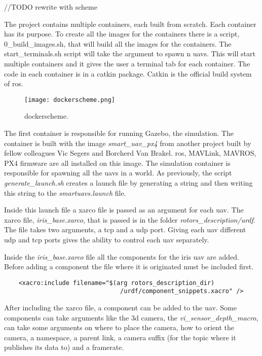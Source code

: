 //TODO rewrite with scheme

The project contains multiple containers, each built from scratch. Each container has its purpose. 
To create all the images for the containers there is a script, 0\_build\_images.sh, that will build 
all the images for the containers. 
The start\_terminals.sh script will take the argument to spawn n \acp{uav}. 
This will start multiple containers and it gives the user a terminal tab for each container. 
The code in each container is in a catkin package. Catkin is the official build system of \acs{ros}. 

\begin{figure}[ht]
    \centering
    \texttt{[image: dockerscheme.png]}
    \caption[dockerscheme]{dockerscheme\footnotemark.}
\end{figure}

The first container is responsible for running Gazebo, the simulation. 
The container is built with the image \textit{smart\_uav\_px4} 
from another project built by fellow colleagues Vic Segers and Borcherd Van Brakel. \acs{ros}, MAVLink, 
MAVROS, PX4 firmware are all installed on this image. 
The simulation container is responsible for spawning all the \acp{uav} in a world. As previously, 
the script \textit{generate\_launch.sh} creates a launch file 
by generating a string and then writing this string to the \textit{smartuavs.launch} file. 

Inside this launch file a xarco file is passed as an argument for each \acs{uav}. 
The xarco file, \textit{iris\_base.xarco}, that is passed is in the folder \textit{rotors\_description/urdf}. 
The file takes two arguments, a \acs{tcp} and a \acs{udp} port. Giving each \acs{uav} different \acs{udp} and 
\acs{tcp} ports gives the ability to control each \acs{uav} separately. 

Inside the \textit{iris\_base.xarco} file all the components for the iris \acs{uav} are added. 
Before adding a component the file where it is originated must be included first. 


\begin{verbatim}
    <xacro:include filename="$(arg rotors_description_dir)
                                /urdf/component_snippets.xacro" />

\end{verbatim}

After including the xarco file, a component can be added to the \acs{uav}. 
Some components can take arguments like the \acs{3d} camera, the \textit{vi\_sensor\_depth\_macro}, 
can take some arguments on where to place the camera, how to orient the camera, 
a namespace, a parent link, a camera suffix (for the topic where it publishes its data to) and a framerate. 

